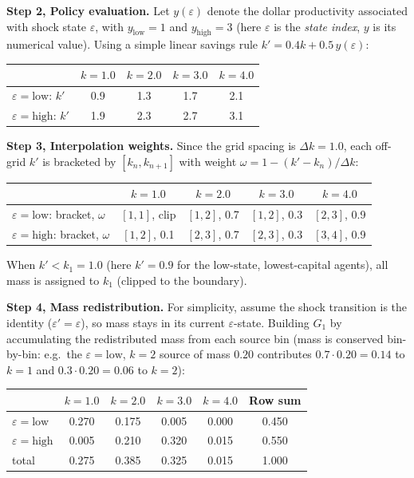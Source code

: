 \documentclass[11pt,a4paper]{report}
\begin{document}
\medskip\noindent
\textbf{Step 2, Policy evaluation.}  Let $y(\varepsilon)$ denote the dollar productivity associated with shock state $\varepsilon$, with $y_{\text{low}}=1$ and $y_{\text{high}}=3$ (here $\varepsilon$ is the \emph{state index}, $y$ is its numerical value).  Using a simple linear savings rule $k' = 0.4 k + 0.5\,y(\varepsilon)$:
\begin{center}\small
\begin{tabular}{l cccc}
\toprule
& $k=1.0$ & $k=2.0$ & $k=3.0$ & $k=4.0$ \\
\midrule
$\varepsilon = \text{low}$:  $k'$ & 0.9 & 1.3 & 1.7 & 2.1 \\
$\varepsilon = \text{high}$: $k'$ & 1.9 & 2.3 & 2.7 & 3.1 \\
\bottomrule
\end{tabular}
\end{center}

\medskip\noindent
\textbf{Step 3, Interpolation weights.}  Since the grid spacing is $\Delta k = 1.0$, each off-grid $k'$ is bracketed by $[k_n, k_{n+1}]$ with weight $\omega = 1 - (k' - k_n)/\Delta k$:
\begin{center}\small
\begin{tabular}{l cccc}
\toprule
& $k=1.0$ & $k=2.0$ & $k=3.0$ & $k=4.0$ \\
\midrule
$\varepsilon = \text{low}$:  bracket, $\omega$ & $[1,1]$, clip & $[1,2]$, 0.7 & $[1,2]$, 0.3 & $[2,3]$, 0.9 \\
$\varepsilon = \text{high}$: bracket, $\omega$ & $[1,2]$, 0.1 & $[2,3]$, 0.7 & $[2,3]$, 0.3 & $[3,4]$, 0.9 \\
\bottomrule
\end{tabular}
\end{center}
When $k' < k_1 = 1.0$ (here $k' = 0.9$ for the low-state, lowest-capital agents), all mass is assigned to $k_1$ (clipped to the boundary).

\medskip\noindent
\textbf{Step 4, Mass redistribution.}  For simplicity, assume the shock transition is the identity ($\varepsilon' = \varepsilon$), so mass stays in its current $\varepsilon$-state.  Building $G_1$ by accumulating the redistributed mass from each source bin (mass is conserved bin-by-bin: e.g.\ the $\varepsilon=\text{low}$, $k=2$ source of mass $0.20$ contributes $0.7\cdot0.20 = 0.14$ to $k=1$ and $0.3\cdot0.20 = 0.06$ to $k=2$):
\begin{center}\small
\begin{tabular}{l cccc c}
\toprule
& $k=1.0$ & $k=2.0$ & $k=3.0$ & $k=4.0$ & Row sum \\
\midrule
$\varepsilon = \text{low}$  & 0.270 & 0.175 & 0.005 & 0.000 & 0.450 \\
$\varepsilon = \text{high}$ & 0.005 & 0.210 & 0.320 & 0.015 & 0.550 \\
\midrule
total                       & 0.275 & 0.385 & 0.325 & 0.015 & 1.000 \\
\bottomrule
\end{tabular}
\end{center}
\end{document}
